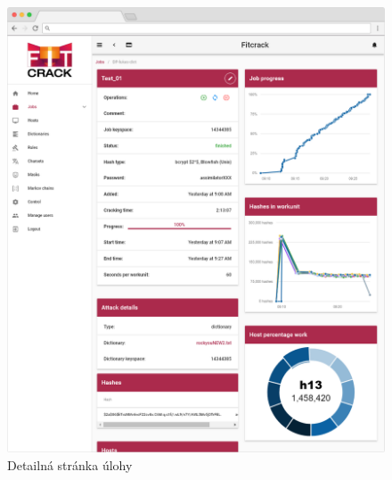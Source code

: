 \documentclass[slovak]{fitthesis}
\begin{document}
\begin{figure}
    \centering
    \includegraphics[scale=0.35]{obrazky/jobDetailFrame.PNG}
    \caption{Detailná stránka úlohy}
    \label{fig:detailPage}
\end{figure}
\end{document}
